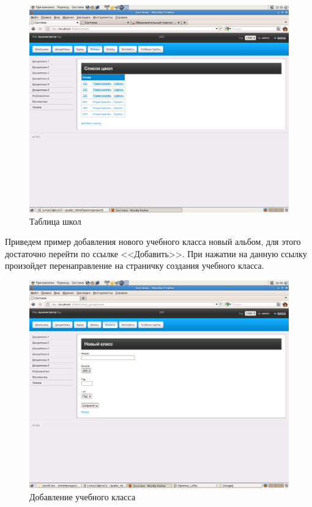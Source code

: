\begin{figure}
\begin{center}
\includegraphics[scale=0.25]{image/schools.png}
\caption{Таблица школ}
\end{center}
\end{figure}

Приведем пример добавления нового учебного класса новый альбом, для этого достаточно перейти по ссылке <<Добавить>>. При нажатии на данную ссылку произойдет перенаправление на страничку создания учебного класса.\\

\begin{figure}
\begin{center}
\includegraphics[scale=0.25]{image/class_new.png}
\caption{Добавление учебного класса}
\end{center}
\end{figure}

